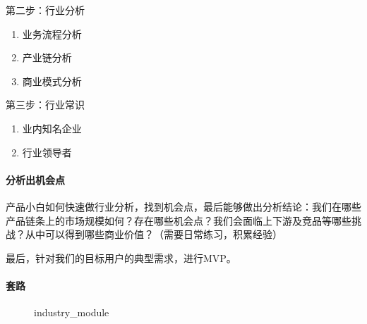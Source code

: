 \documentclass[letterpaper,10pt,english]{sphinxmanual}
\begin{document}
第二步：行业分析
\begin{enumerate}
%
\item {} 
业务流程分析

\item {} 
产业链分析

\item {} 
商业模式分析

\end{enumerate}

第三步：行业常识
\begin{enumerate}
%
\item {} 
业内知名企业

\item {} 
行业领导者

\end{enumerate}


\paragraph{分析出机会点}
\label{\detokenize{chapter_knowledge/industry_analysis:id4}}
产品小白如何快速做行业分析，找到机会点，最后能够做出分析结论：我们在哪些产品链条上的市场规模如何？存在哪些机会点？我们会面临上下游及竞品等哪些挑战？从中可以得到哪些商业价值？（需要日常练习，积累经验）

最后，针对我们的目标用户的典型需求，进行MVP。


\paragraph{套路}
\label{\detokenize{chapter_knowledge/industry_analysis:id5}}
\begin{figure}[H]
\centering
\capstart

\noindent{}
\caption{industry\_module}\label{\detokenize{chapter_knowledge/industry_analysis:id27}}\end{figure}
\end{document}
